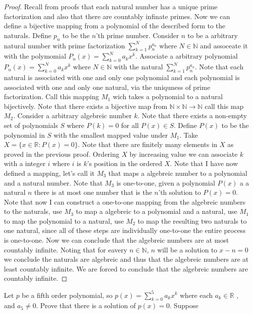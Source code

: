 \documentclass[12pt]{article}
\makeatletter
\theoremstyle{homework}
\newenvironment{exercise}[1]
{\def\@currentlabel{#1}\exercisecore}
{\endexercisecore}
\makeatother
\begin{document}
\begin{proof}
Recall from proofs that each natural number has a unique prime factorization and also that there are countably infinate primes.  Now we can define a bijective mapping from a polynomial of the described form to the naturals.  Define $p_n$ to be the $n$'th prime number.  Consider $n$ to be a arbitrary natural number with prime factorization $\sum^N_{k=1}p_n^{a_n}$ where $N\in\mathbb{N}$ and assoceate it with the polymomial $P_n(x)=\sum_{k=0}^N a_k x^k$.  Associate a arbitrary polynomial $P_n(x)=\sum_{k=0}^N a_k x^k$ where $N\in\mathbb{N}$ with the natural $\sum^N_{k=1}p_n^{a_n}$.  Note that each natural is associated with one and only one polynomial and each polynomial is associated with one and only one natural, via the uniquness of prime factorization.  Call this mapping $M_1$ wich takes a polynomial to a natural bijectively.  Note that there exists a bijective map from $\mathbb{N}\times \mathbb{N}\rightarrow\mathbb{N}$ call this map $M_2$.  Consider a arbitrary algebreic number $k$.  Note that there exists a non-empty set of polynomials $S$ where $P(k)=0$ for all $P(x)\in S$.  Define $P(x)$ to be the polynomial in $S$ with the smallest mapped value under $M_1$.  Take $X=\{x\in\mathbb{R}:P(x)=0\}$.  Note that there are finitely many elements in $X$ as proved in the previous proof.  Ordering $X$ by increasing value we can associate $k$ with a integer $i$ where $i$ is $k$'s position in the ordered $X$.  Note that I have now defined a mapping, let's call it $M_3$ that maps a algebreic number to a polynomial and a natural number.  Note that $M_3$ is one-to-one, given a polynomial $P(x)$ a a natural $n$ there is at most one number that is the $n$'th solution to $P(x)=0$.  Note that now I can construct a one-to-one mapping from the algebreic numbers to the naturals, use $M_3$ to map a algebreic to a polynomial and a natural, use $M_1$ to map the polynomial to a natural, use $M_2$ to map the resulting two naturals to one natural, since all of these steps are individually one-to-one the entire process is one-to-one.  Now we can conclude that the algebreic numbers are at most countably infinite.  Noting that for eavery $n\in\mathbb{N}$, $n$ will be a solution to $x-n=0$ we conclude the naturals are algebreic and thus that the algebreic numbers are at least countably infinite.  We are forced to conclude that the algebreic numbers are countably infinite.
\end{proof}
\begin{exercise}
3
Let $p$ be a fifth order polynomial, so $p(x) = \sum^5_{k=0} a_kx^k$ where each $a_k\in\mathbb{R}$ , and $a_5 \neq 0$.
Prove that there is a solution of $p(x) = 0$.
\end{exercise}
Suppose
\end{document}
